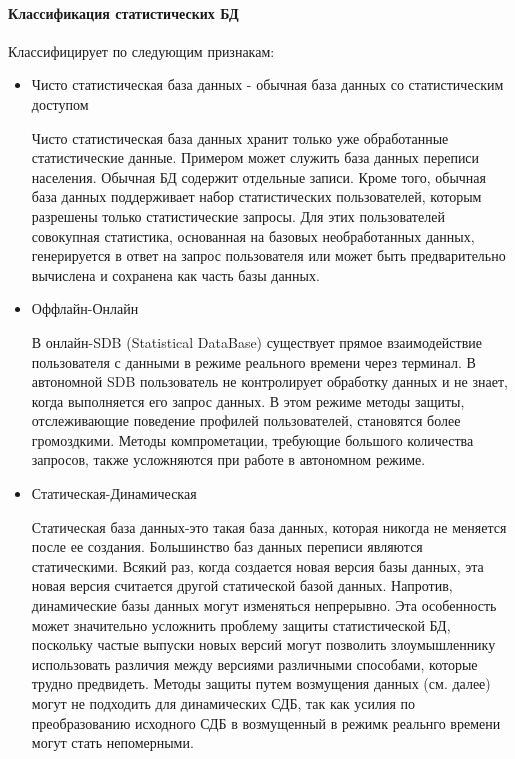 \paragraph{Классификация статистических БД}
Классифицирует по следующим признакам:
\begin{itemize}

    \item Чисто статистическая база данных - обычная база данных со статистическим доступом

Чисто статистическая база данных хранит только уже обработанные статистические данные. Примером может служить база данных переписи населения.
Обычная БД содержит отдельные записи. Кроме того, обычная база данных поддерживает набор статистических пользователей, которым разрешены только статистические запросы. Для этих пользователей совокупная статистика, основанная на базовых необработанных данных, генерируется в ответ на запрос пользователя или может быть предварительно вычислена и сохранена как часть базы данных.

    \item Оффлайн-Онлайн

В онлайн-SDB (Statistical DataBase) существует прямое взаимодействие пользователя с данными в режиме реального времени через терминал. В автономной SDB пользователь не контролирует обработку данных и не знает, когда выполняется его запрос данных. В этом режиме методы защиты, отслеживающие поведение профилей пользователей, становятся более громоздкими. Методы компрометации, требующие большого количества запросов, также усложняются при работе в автономном режиме.

    \item Статическая-Динамическая

Статическая база данных-это такая база данных, которая никогда не меняется после ее создания. Большинство баз данных переписи являются статическими. Всякий раз, когда создается новая версия базы данных, эта новая версия считается другой статической базой данных. Напротив, динамические базы данных могут изменяться непрерывно. Эта особенность может значительно усложнить проблему защиты статистической БД, поскольку частые выпуски новых версий могут позволить злоумышленнику использовать различия между версиями различными способами, которые трудно предвидеть. Методы защиты путем возмущения данных (см. далее) могут не подходить для динамических СДБ, так как усилия по преобразованию исходного СДБ в возмущенный в режимк реальнго времени могут стать непомерными.


\end{itemize}
